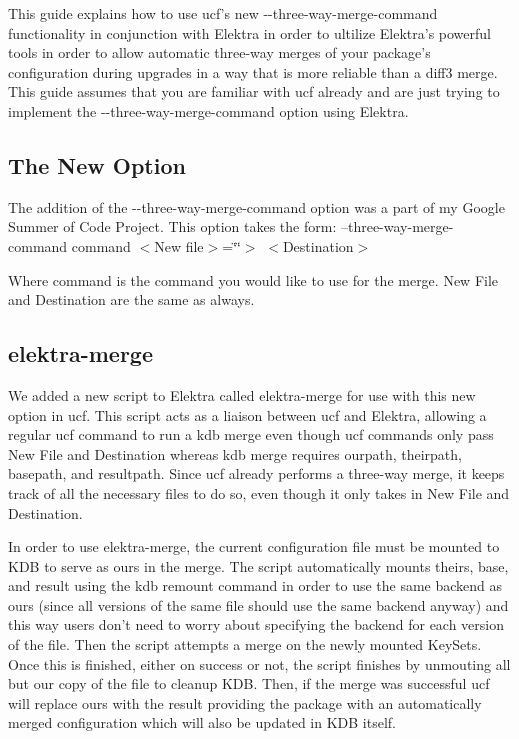 This guide explains how to use ucf's new {\ttfamily -\/-\/three-\/way-\/merge-\/command} functionality in conjunction with Elektra in order to ultilize Elektra's powerful tools in order to allow automatic three-\/way merges of your package's configuration during upgrades in a way that is more reliable than a diff3 merge. This guide assumes that you are familiar with ucf already and are just trying to implement the {\ttfamily -\/-\/three-\/way-\/merge-\/command} option using Elektra.

\subsection*{The New Option}

The addition of the {\ttfamily -\/-\/three-\/way-\/merge-\/command} option was a part of my Google Summer of Code Project. This option takes the form\+: --three-\/way-\/merge-\/command command $<$\+New file$>$=\char`\"{}\char`\"{}$>$ $<$\+Destination$>$

Where {\ttfamily command} is the command you would like to use for the merge. {\ttfamily New File} and {\ttfamily Destination} are the same as always.

\subsection*{elektra-\/merge}

We added a new script to Elektra called elektra-\/merge for use with this new option in ucf. This script acts as a liaison between ucf and Elektra, allowing a regular ucf command to run a {\ttfamily kdb merge} even though ucf commands only pass {\ttfamily New File} and {\ttfamily Destination} whereas kdb merge requires {\ttfamily ourpath}, {\ttfamily theirpath}, {\ttfamily basepath}, and {\ttfamily resultpath}. Since ucf already performs a three-\/way merge, it keeps track of all the necessary files to do so, even though it only takes in {\ttfamily New File} and {\ttfamily Destination}.

In order to use {\ttfamily elektra-\/merge}, the current configuration file must be mounted to K\+D\+B to serve as {\ttfamily ours} in the merge. The script automatically mounts {\ttfamily theirs}, {\ttfamily base}, and {\ttfamily result} using the {\ttfamily kdb remount} command in order to use the same backend as {\ttfamily ours} (since all versions of the same file should use the same backend anyway) and this way users don't need to worry about specifying the backend for each version of the file. Then the script attempts a merge on the newly mounted Key\+Sets. Once this is finished, either on success or not, the script finishes by unmouting all but {\ttfamily our} copy of the file to cleanup K\+D\+B. Then, if the merge was successful ucf will replace {\ttfamily ours} with the result providing the package with an automatically merged configuration which will also be updated in K\+D\+B itself.


